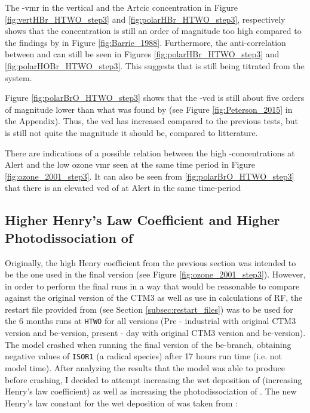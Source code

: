 \medskip

The -\acrshort{vmr} in the vertical and the Artcic concentration in Figure \ref{fig:vertHBr_HTWO_step3} and \ref{fig:polarHBr_HTWO_step3}, respectively shows that the  concentration is still an order of magnitude too high compared to the findings by \cite{barrie} in Figure \ref{fig:Barrie_1988}. Furthermore, the anti-correlation between  and  can still be seen in Figures \ref{fig:polarHBr_HTWO_step3} and \ref{fig:polarHOBr_HTWO_step3}. This suggests that  is still being titrated from the system. 

\medskip

Figure \ref{fig:polarBrO_HTWO_step3} shows that the -\acrshort{vcd} is still about five orders of magnitude lower than what was found by \cite{Peterson2015} (see Figure \ref{fig:Peterson_2015} in the Appendix). Thus, the \acrshort{vcd} has increased compared to the previous tests, but is still not quite the magnitude it should be, compared to litterature. 

\medskip

There are indications of a possible relation between the high -concentrations at Alert and the low ozone \acrshort{vmr} seen at the same time period in Figure \ref{fig:ozone_2001_step3}. It can also be seen from \ref{fig:polarBrO_HTWO_step3} that there is an elevated \acrshort{vcd} of  at Alert in the same  time-period

\subsection{Higher Henry's Law Coefficient and Higher Photodissociation of }\label{sec:disc_step4}

Originally, the high Henry coefficient from the previous section was intended to be the one used in the final version (see Figure \ref{fig:ozone_2001_step3}). However, in order to perform the final runs in a way that would be reasonable to compare against the original version of the CTM3 as well as use in calculations of RF, the restart file provided from \cite{StefaniePersonal} (see Section \ref{subsec:restart_files}) was to be used for the 6 months runs at \texttt{HTWO} for all versions (Pre - industrial with original CTM3 version and \acrshort{be}-version, present - day with original CTM3 version and \acrshort{be}-version). The model crashed when running the final version of the \acrshort{be}-branch, obtaining negative values of \texttt{ISOR1} (a radical species) after 17 hours run time (i.e. not model time). After analyzing the results that the model was able to produce before crashing, I decided to attempt increasing the wet deposition of  (increasing Henry's law coefficient) as well as increasing the photodissociation of . The new Henry's law constant for the wet deposition of  was taken from \cite{Sander99}: 


